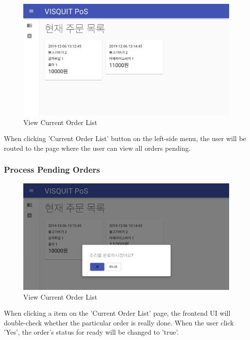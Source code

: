 \documentclass[conference,compsoc]{IEEEtran}
\begin{document}
\begin{figure}[h!]
  \includegraphics[width=\linewidth]{figures/frontend/08-orderlist.png}
  \caption{View Current Order List}
  \label{fig:08-orderlist}
\end{figure}

When clicking 'Current Order List' button on the left-side menu, the user will be routed to the page where the user can view all orders pending. 

\subsubsection{Process Pending Orders}

\begin{figure}[h!]
  \includegraphics[width=\linewidth]{figures/frontend/09-order-finish-modal.png}
  \caption{View Current Order List}
  \label{fig:09-order-finish-modal}
\end{figure}

When clicking a item on the 'Current Order List' page, the frontend UI will double-check whether the particular order is really done. When the user click 'Yes', the order's status for ready will be changed to 'true'.
\end{document}
